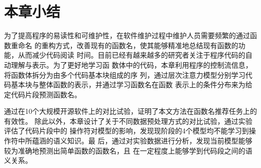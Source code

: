 \section{本章小结}
为了提高程序的易读性和可维护性，在软件维护过程中维护人员需要频繁的通过函数重命名
的重构方式，改善现有的函数名，使其能够精准地总结现有函数的功能，从而减少代码阅读
时间。目前已经有越来越多的研究者关注于程序代码的自动理解与表示。为了更好地学习函
数体中的代码，本章利用程序的控制流信息，将函数体拆分为由多个代码基本块组成的序
列，通过层次注意力模型分别学习代码基本块与整体函数的表示，并通过学习函数名在函数
表示上的条件分布来为给定代码片段预测函数名。

通过在10个大规模开源软件上的对比试验，证明了本文方法在函数名推荐任务上的有效性。
除此以外，本章设计了关于不同数据预处理方式的对比试验，通过实验评估了代码片段中的
操作符对模型的影响，发现现阶段的4个模型均不能学习到操作符中所蕴涵的语义知识。最
后，通过对实验数据进行分析，发现当前模型能够较为准确地预测出简单函数的函数名，且
在一定程度上能够学到代码段之间的语义关系。

